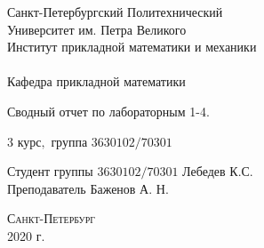 \documentclass[a4]{article}
\begin{document}
\def\contentsname{\LARGE{Содержание}}
\thispagestyle{empty}
\begin{center} 

\vspace{2cm} 
{\Large \sc Санкт-Петербургский Политехнический}\\
\vspace{2mm}
{\Large \sc Университет} им. {\Large\sc Петра Великого}\\
\vspace{1cm}
{\large \sc Институт прикладной математики и механики\\ 
\vspace{0.5mm}
\textsc{}}\\ 
\vspace{0.5mm}
{\large\sc Кафедра прикладной математики}\\
\vspace{15mm}


{\huge \sc Сводный отчет по лабораторным 1-4.

 }
\vspace*{2mm}


\vspace{1cm}

{\sc $3$ курс$,$ группа $3630102/70301$}

\vspace{2cm} 
Студент группы $3630102/70301$ \hfill Лебедев К.С.\\
\vspace{1cm}
Преподаватель \hfill Баженов А. Н.\\
\vspace{20mm} 

\end{center} 
\begin{center}
\vfill {\large\textsc{Санкт-Петербург}}\\ 
2020 г.
\end{center}

\end{document}
